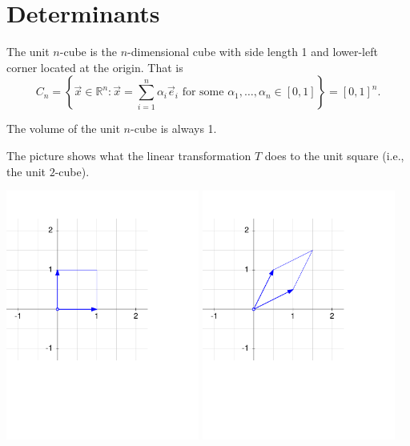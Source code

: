 \documentclass[14pt]{problemset}
\newcommand{\R}{\mathbb{R}}
\begin{document}
\section*{Determinants}
	\begin{definition}
		The unit $n$-cube is the $n$-dimensional cube with side length 1 and lower-left
		corner located at the origin.  That is 
		\[
			C_n = \left\{\vec x\in\R^n:\vec x=\sum_{i=1}^n \alpha_i\vec e_i\text{ for some }\alpha_1,\ldots,\alpha_n\in[0,1]\right\}=[0,1]^n.
		\]
	\end{definition}
	The volume of the unit $n$-cube is always 1.

	\question
	The picture shows what the linear transformation $T$ does to the unit square (i.e., the unit $2$-cube).

	\begin{center}
	\includegraphics[width=2.5in]{images/transform1b.pdf}
	\includegraphics[width=2.5in]{images/transform2b.pdf}
	\end{center}
\end{document}
